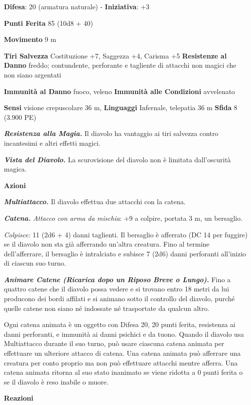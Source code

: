 \begin{multicols}{2}
\textbf{Difesa}: 20 (armatura naturale) - \textbf{Iniziativa}: +3

\textbf{Punti Ferita} 85 (10d8 + 40)

\textbf{Movimento} 9 m

\textbf{Tiri Salvezza} Costituzione +7, Saggezza +4, Carisma +5
\textbf{Resistenze al Danno} freddo; contundente, perforante e tagliente
di attacchi non magici che non siano argentati

\textbf{Immunità al Danno} fuoco, veleno \textbf{Immunità alle
Condizioni} avvelenato

\textbf{Sensi} visione crepuscolare 36 m, 
\textbf{Linguaggi} Infernale, telepatia 36 m \textbf{Sfida} 8 (3.900 PE)

\emph{\textbf{Resistenza alla Magia.}} Il diavolo ha vantaggio ai tiri
salvezza contro incantesimi e altri effetti magici.

\emph{\textbf{Vista del Diavolo.}} La scurovisione del diavolo non è
limitata dall'oscurità magica.

\textbf{Azioni}

\emph{\textbf{Multiattacco.}} Il diavolo effettua due attacchi con la
catena.

\emph{\textbf{Catena.} Attacco con arma da mischia}: +9 a colpire,
portata 3 m, un bersaglio.

\emph{Colpisce:} 11 (2d6 + 4) danni taglienti. Il bersaglio è afferrato
(DC 14 per fuggire) se il diavolo non sta già afferrando un'altra
creatura. Fino al termine dell'afferrare, il bersaglio è intralciato e
subisce 7 (2d6) danni perforanti all'inizio di ciascun suo turno.

\emph{\textbf{Animare Catene (Ricarica dopo un Riposo Breve o Lungo).}}
Fino a quattro catene che il diavolo possa vedere e si trovano entro 18
metri da lui producono dei bordi affilati e si animano sotto il
controllo del diavolo, purché quelle catene non siano né indossate né
trasportate da qualcun altro.

Ogni catena animata è un oggetto con Difesa 20, 20 punti ferita, resistenza
ai danni perforanti, e immunità ai danni psichici e da tuono. Quando il
diavolo usa Multiattacco durante il suo turno, può usare ciascuna catena
animata per effettuare un ulteriore attacco di catena. Una catena
animata può afferrare una creatura per conto proprio ma non può
effettuare attacchi mentre afferra. Una catena animata ritorna al suo
stato inanimato se viene ridotta a 0 punti ferita o se il diavolo è reso
inabile o muore.

\textbf{Reazioni}


\end{multicols}
